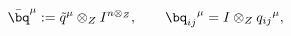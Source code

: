 \begin{equation}
\label{first}
\bar\bq^\mu:=\tilde q^\mu\otimes_ZI^{n\otimes_Z},\quad
\quad {\bq_{ij}}^\mu=I\otimes_Z {q_{ij}}^\mu,
\end{equation}


